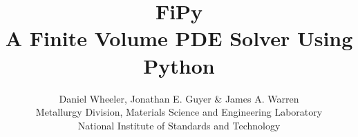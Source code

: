 \documentclass[letterpaper,oldfontcommands]{memoir}
\newcommand{\logo}{\rotatebox{4}{\textcolor{red}{\( \varphi \)}}\kern-.7em\raisebox{-.15em}{\textcolor{blue}{\( \pi\)}}}
\begin{document}
\settypeblocksize{9in}{7in}{*}
\setlrmargins{*}{*}{*}
\setulmargins{*}{*}{*}


\checkandfixthelayout

\fixpdflayout

\setlength{\parindent}{0ex}
\setlength{\fboxrule}{2\fboxrule}
\newlength{\BCL} %

\pagestyle{Ruled}
\renewcommand{\sectionmark}[1]{\markboth{#1}{}}
\renewcommand{\subsectionmark}[1]{\markright{#1}}

\newenvironment{Ventry}[1]%
  {\begin{list}{}{%
    \renewcommand{\makelabel}[1]{\texttt{##1:}\hfil}%
    \settowidth{\labelwidth}{\texttt{#1:}}%
    \setlength{\leftmargin}{\labelsep}%
    \addtolength{\leftmargin}{\labelwidth}}}%
  {\end{list}}

\title{
FiPy\\
{\large A Finite Volume PDE Solver Using Python} \\
}

\author{Daniel Wheeler, Jonathan E. Guyer \& James A. Warren \\[2ex]
Metallurgy Division, Materials Science and Engineering Laboratory\\
National Institute of Standards and Technology}

\maketitle

% 
% 
% 
% 
% 
% 
% 
% 
% 






\printindex
\end{document}
